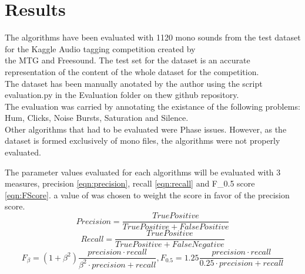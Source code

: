 
\chapter{Results}

The algorithms have been evaluated with 1120 mono sounds from the test dataset for the Kaggle Audio tagging competition created by \\
the MTG and Freesound. The test set for the dataset is an accurate representation of the content of the whole dataset for the competition. \\
The dataset has been manually anotated by the author using the script evaluation.py in the Evaluation folder on thew github repository. \\
The evaluation was carried by annotating the existance of the following problems: Hum, Clicks, Noise Bursts, Saturation and Silence. \\
Other algorithms that had to be evaluated were Phase issues. However, as the dataset is formed exclusively of mono files, the algorithms were not properly evaluated.

The parameter values evaluated for each algorithms will be evaluated with 3 measures, precision \ref{eqn:precision}, recall \ref{eqn:recall} and F_{0.5} score \ref{eqn:FScore}.
a value of  was chosen to weight the score in favor of the precision score.
\begin{equation}\label{eqn:precision}
	Precision = \frac{TruePositive}{TruePositive + FalsePositive}
\end{equation}
\begin{equation}\label{eqn:recall}
	Recall = \frac{TruePositive}{TruePositive + FalseNegative}
\end{equation}
\begin{equation}\label{eqn:FScore}
	F_{\beta} = (1+\beta^2)\frac{precision·recall}{\beta^2·precision + recall}, F_{0.5} = 1.25\frac{precision·recall}{0.25·precision + recall}
\end{equation}


